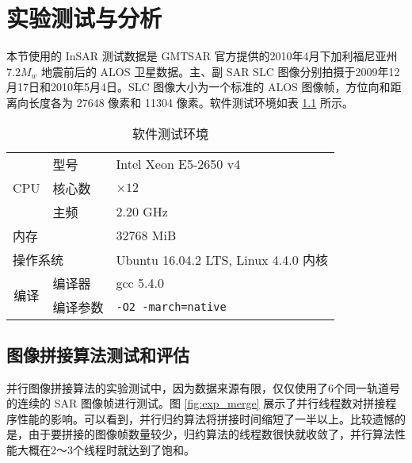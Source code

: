 \chapter{实验测试与分析}

本节使用的 InSAR 测试数据是 GMTSAR 官方提供的2010年4月下加利福尼亚州 $7.2 M_w$ 地震前后的 ALOS 卫星数据。主、副 SAR SLC 图像分别拍摄于2009年12月17日和2010年5月4日。SLC 图像大小为一个标准的 ALOS 图像帧，方位向和距离向长度各为 27648 像素和 11304 像素。软件测试环境如表 \ref{tab:env} 所示。

\begin{table}[htbp]
\centering
\begin{tabular}{|l|l|l|}
\hline
    \multirow{3}{*}{CPU}                        & 型号     & Intel Xeon E5-2650 v4                 \\ \cline{2-3} 
                                                & 核心数   & $\times 12$                           \\ \cline{2-3} 
                                                & 主频     & 2.20 GHz                              \\ \hline
    \multicolumn{2}{|l|}{内存}                             & 32768 MiB                             \\ \hline
    \multicolumn{2}{|l|}{操作系统}                         & Ubuntu 16.04.2 LTS, Linux 4.4.0 内核  \\ \hline
    \multicolumn{1}{|c|}{\multirow{2}{*}{编译}} & 编译器   & gcc 5.4.0                             \\ \cline{2-3} 
    \multicolumn{1}{|c|}{}                      & 编译参数 & \texttt{-O2 -march=native}            \\ \hline
\end{tabular}
\caption{软件测试环境} \label{tab:env}
\end{table}

\section{图像拼接算法测试和评估}

并行图像拼接算法的实验测试中，因为数据来源有限，仅仅使用了6个同一轨道号的连续的 SAR 图像帧进行测试。图 \ref{fig:exp_merge} 展示了并行线程数对拼接程序性能的影响。可以看到，并行归约算法将拼接时间缩短了一半以上。比较遗憾的是，由于要拼接的图像帧数量较少，归约算法的线程数很快就收敛了，并行算法性能大概在2～3个线程时就达到了饱和。

